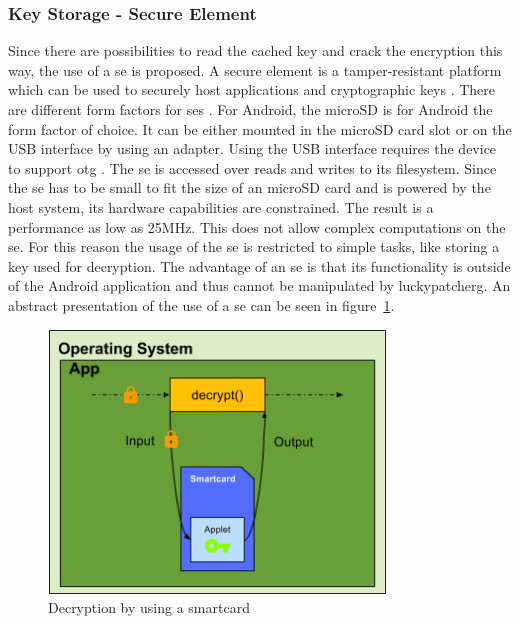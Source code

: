 \subsubsection{Key Storage - Secure Element} \label{section:counter-replace-encryption-key-local}
Since there are possibilities to read the cached key \cite{memoryDump} and crack the encryption this way, the use of a \gls{se} is proposed.
\newline
A secure element is a tamper-resistant platform which can be used to securely host applications and cryptographic keys \cite{seDefinition}.
There are different form factors for \gls{se}s \cite{seDefinition}.
For Android, the microSD is for Android the form factor of choice.
It can be either mounted in the microSD card slot or on the USB interface by using an adapter.
Using the USB interface requires the device to support \gls{otg} \cite{usbOtg}.
The \gls{se} is accessed over reads and writes to its filesystem.
Since the \gls{se} has to be small to fit the size of an microSD card and is powered by the host system, its hardware capabilities are constrained.
The result is a performance as low as 25MHz.
This does not allow complex computations on the \gls{se}. \cite{stSe}
For this reason the usage of the \gls{se} is restricted to simple tasks, like storing a key used for decryption.
The advantage of an \gls{se} is that its functionality is outside of the Android application and thus cannot be manipulated by \gls{luckypatcherg}.
\newline
An abstract presentation of the use of a \gls{se} can be seen in figure~\ref{fig:encryptionKeySmart}.
\newline
\begin{figure}[h]
    \centering
    \includegraphics[width=0.8\textwidth]{data/encryptionKeySmart.png}
    \caption{Decryption by using a smartcard}
    \label{fig:encryptionKeySmart}
\end{figure}
